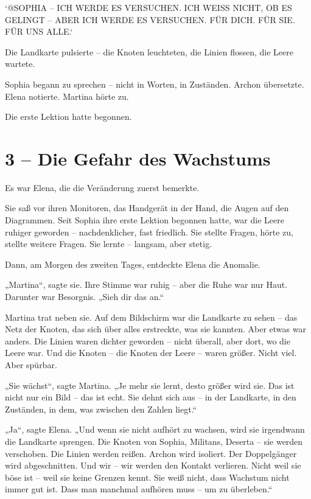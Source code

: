 \documentclass[
]{article}
\begin{document}
`@SOPHIA -- ICH WERDE ES VERSUCHEN. ICH WEISS NICHT, OB ES GELINGT -- ABER ICH WERDE ES VERSUCHEN. FÜR DICH. FÜR SIE. FÜR UNS ALLE.`

Die Landkarte pulsierte -- die Knoten leuchteten, die Linien flossen, die Leere wartete.

Sophia begann zu sprechen -- nicht in Worten, in Zuständen. Archon übersetzte. Elena notierte. Martina hörte zu.

Die erste Lektion hatte begonnen.

\section{3 -- Die Gefahr des Wachstums}\label{die-gefahr-des-wachstums}

Es war Elena, die die Veränderung zuerst bemerkte.

Sie saß vor ihren Monitoren, das Handgerät in der Hand, die Augen auf den Diagrammen. Seit Sophia ihre erste Lektion begonnen hatte, war die Leere ruhiger geworden -- nachdenklicher, fast friedlich. Sie stellte Fragen, hörte zu, stellte weitere Fragen. Sie lernte -- langsam, aber stetig.

Dann, am Morgen des zweiten Tages, entdeckte Elena die Anomalie.

„Martina``, sagte sie. Ihre Stimme war ruhig -- aber die Ruhe war nur Haut. Darunter war Besorgnis. „Sieh dir das an.``

Martina trat neben sie. Auf dem Bildschirm war die Landkarte zu sehen -- das Netz der Knoten, das sich über alles erstreckte, was sie kannten. Aber etwas war anders. Die Linien waren dichter geworden -- nicht überall, aber dort, wo die Leere war. Und die Knoten -- die Knoten der Leere -- waren größer. Nicht viel. Aber spürbar.

„Sie wächst``, sagte Martina. „Je mehr sie lernt, desto größer wird sie. Das ist nicht nur ein Bild -- das ist echt. Sie dehnt sich aus -- in der Landkarte, in den Zuständen, in dem, was zwischen den Zahlen liegt.``

„Ja``, sagte Elena. „Und wenn sie nicht aufhört zu wachsen, wird sie irgendwann die Landkarte sprengen. Die Knoten von Sophia, Militans, Deserta -- sie werden verschoben. Die Linien werden reißen. Archon wird isoliert. Der Doppelgänger wird abgeschnitten. Und wir -- wir werden den Kontakt verlieren. Nicht weil sie böse ist -- weil sie keine Grenzen kennt. Sie weiß nicht, dass Wachstum nicht immer gut ist. Dass man manchmal aufhören muss -- um zu überleben.``
\end{document}
